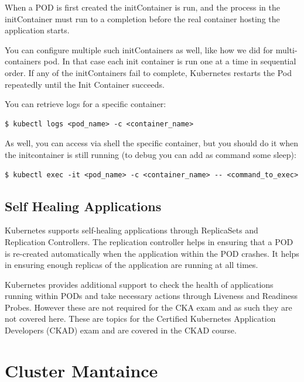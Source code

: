 \documentclass{article}
\newenvironment{blocktemplateII}[1]{%
    \tcolorbox[beamer,%
    noparskip,breakable,
    colframe=Green,%
    colbacklower=LimeGreen!75!LightGreen,%
    title=#1]}%
    {\endtcolorbox}
\newenvironment{codetemplate}[1][]{%
  \mybasecolorbox[#1]
  \itshape
}{%
  \endmybasecolorbox
}
\begin{document}
When a POD is first created the initContainer is run, and the process in the initContainer must run to a completion before the real container hosting the application starts. 

You can configure multiple such initContainers as well, like how we did for multi-containers pod. In that case each init container is run one at a time in sequential order. If any of the initContainers fail to complete, Kubernetes restarts the Pod repeatedly until the Init Container succeeds.

You can retrieve logs for a specific container:
\begin{codetemplate}{}
\begin{verbatim}
$ kubectl logs <pod_name> -c <container_name>
\end{verbatim}
\end{codetemplate}

\begin{blocktemplateII}{NOTE}
As well, you can access via shell the specific container,
but you should do it when the initcontainer is still running (to debug you can add as command some sleep):
\begin{codetemplate}{}
\begin{verbatim}
$ kubectl exec -it <pod_name> -c <container_name> -- <command_to_exec>
\end{verbatim}
\end{codetemplate}
\end{blocktemplateII}

\subsection{Self Healing Applications}

Kubernetes supports self-healing applications through ReplicaSets and Replication Controllers. The replication controller helps in ensuring that a POD is re-created automatically when the application within the POD crashes. It helps in ensuring enough replicas of the application are running at all times.

Kubernetes provides additional support to check the health of applications running within PODs and take necessary actions through Liveness and Readiness Probes. However these are not required for the CKA exam and as such they are not covered here. These are topics for the Certified Kubernetes Application Developers (CKAD) exam and are covered in the CKAD course.

\section{Cluster Mantaince}
\end{document}

